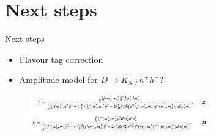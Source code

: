 \documentclass{beamer}
\begin{document}
\section{Next steps}
\begin{frame}{Next steps}
  \begin{itemize}
    \setlength\itemsep{2em}
    \item{Flavour tag correction}
    \item{Amplitude model for $D\to K_{S, L}h^+h^-$?}
  \end{itemize}
  \vspace{1cm}
  \begin{figure}
    \centering
    \includegraphics[width=0.7\textwidth]{DCSCorrection.png}
  \end{figure}
\end{frame}
\end{document}
